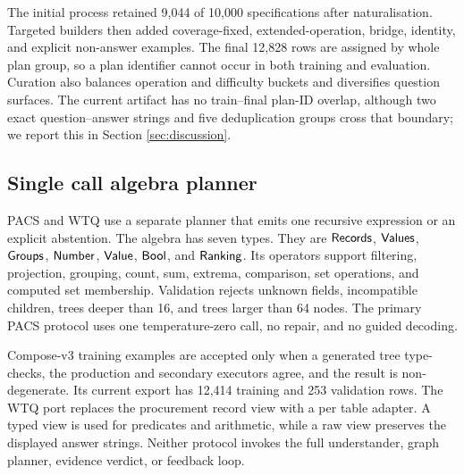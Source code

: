 The initial process retained 9,044 of 10,000 specifications after naturalisation.  Targeted builders
then added coverage-fixed, extended-operation, bridge, identity, and explicit non-answer examples.
The final 12,828 rows are assigned by whole plan group, so a plan identifier cannot occur in both
training and evaluation.  Curation also balances operation and difficulty buckets and diversifies
question surfaces.  The current artifact has no train--final plan-ID overlap, although two exact
question--answer strings and five deduplication groups cross that boundary; we report this in
Section \ref{sec:discussion}.

\subsection{Single call algebra planner}
\label{sec:m-compose}

PACS and WTQ use a separate planner that emits one recursive expression or an explicit abstention.
The algebra has seven types.  They are $\mathsf{Records}$, $\mathsf{Values}$, $\mathsf{Groups}$, $\mathsf{Number}$,
$\mathsf{Value}$, $\mathsf{Bool}$, and $\mathsf{Ranking}$.  Its operators support filtering, projection, grouping,
count, sum, extrema, comparison, set operations, and computed set membership.  Validation rejects unknown
fields, incompatible children, trees deeper than 16, and trees larger than 64 nodes.  The primary
PACS protocol uses one temperature-zero call, no repair, and no guided decoding.

Compose-v3 training examples are accepted only when a generated tree type-checks, the production
and secondary executors agree, and the result is non-degenerate.  Its current export has 12,414
training and 253 validation rows.  The WTQ port replaces the procurement record view with a
per table adapter.  A typed view is used for predicates and arithmetic, while a raw view preserves
the displayed answer strings.  Neither protocol invokes the full understander, graph planner,
evidence verdict, or feedback loop.
